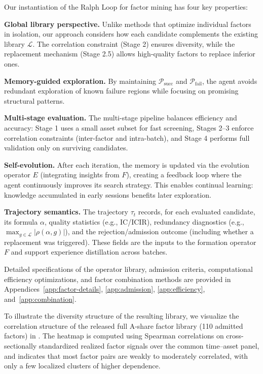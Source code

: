 \documentclass[sigconf]{acmart}
\begin{document}
Our instantiation of the Ralph Loop for factor mining has four key properties:

\textbf{Global library perspective.}
Unlike methods that optimize individual factors in isolation, our approach considers how each candidate complements the existing library $\mathcal{L}$.
The correlation constraint (Stage 2) ensures diversity, while the replacement mechanism (Stage 2.5) allows high-quality factors to replace inferior ones.

\textbf{Memory-guided exploration.}
By maintaining $\mathcal{P}_{\text{succ}}$ and $\mathcal{P}_{\text{fail}}$, the agent avoids redundant exploration of known failure regions while focusing on promising structural patterns.

\textbf{Multi-stage evaluation.}
The multi-stage pipeline balances efficiency and accuracy: Stage 1 uses a small asset subset for fast screening, Stages 2--3 enforce correlation constraints (inter-factor and intra-batch), and Stage 4 performs full validation only on surviving candidates.

\textbf{Self-evolution.}
After each iteration, the memory is updated via the evolution operator $E$ (integrating insights from $F$), creating a feedback loop where the agent continuously improves its search strategy.
This enables continual learning: knowledge accumulated in early sessions benefits later exploration.

\noindent\textbf{Trajectory semantics.}
The trajectory $\tau_t$ records, for each evaluated candidate, its formula $\alpha$, quality statistics (e.g., IC/ICIR), redundancy diagnostics (e.g., $\max_{g\in\mathcal{L}}|\rho(\alpha,g)|$), and the rejection/admission outcome (including whether a replacement was triggered). These fields are the inputs to the formation operator $F$ and support experience distillation across batches.

Detailed specifications of the operator library, admission criteria, computational efficiency optimizations, and factor combination methods are provided in Appendices~\ref{app:factor-details}, \ref{app:admission}, \ref{app:efficiency}, and~\ref{app:combination}.

To illustrate the diversity structure of the resulting library, we visualize the correlation structure of the released full A-share factor library (110 admitted factors) in . The heatmap is computed using Spearman correlations on cross-sectionally standardized realized factor signals over the common time--asset panel, and indicates that most factor pairs are weakly to moderately correlated, with only a few localized clusters of higher dependence.
\end{document}
